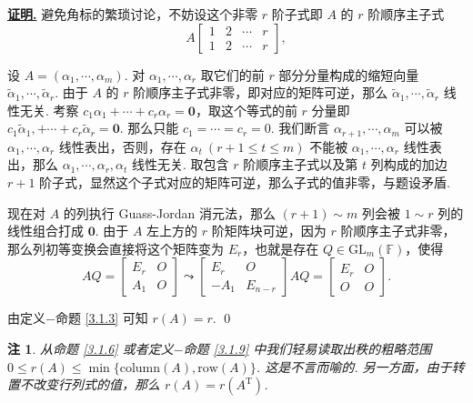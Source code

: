 \documentclass[10pt,openany]{article}
\theoremstyle{thmstyle} %
\theoremstyle{defstyle} %
\theoremstyle{prostyle} %
\theoremstyle{exastyle}
\theoremstyle{remstyle}
\newtheorem{remark}[theorem]{注}
\renewenvironment{proof}[1][证明]{\par\underline{\textbf{#1.}} \;\fangsong}{\qed\par}
\newcommand{\T}{^{\text{T}}}
\newcommand{\gfm}{\text{GL}_m(\mathbb{F})}
\begin{document}
\begin{proof}
	避免角标的繁琐讨论，不妨设这个非零 \( r \) 阶子式即 \( A \) 的 \( r \) 阶顺序主子式
	\[ A\begin{bmatrix}
		1 & 2 & \cdots & r \\
		1 & 2 & \cdots & r
	\end{bmatrix}, \]
	
	设 \( A=(\alpha_1,\cdots,\alpha_m) \). 对 \( \alpha_1,\cdots,\alpha_r \) 取它们的前 \( r \) 部分分量构成的缩短向量 \( \widetilde{\alpha}_1, \cdots, \widetilde{\alpha}_r \). 由于 \( A \) 的 \( r \) 阶顺序主子式非零，即对应的矩阵可逆，那么 \( \widetilde{\alpha}_1, \cdots, \widetilde{\alpha}_r  \) 线性无关. 考察 \( c_1\alpha_1+\cdots+c_r\alpha_r=\bm{0} \)，取这个等式的前 \( r \) 分量即 \( c_1\widetilde{\alpha}_1,+\cdots+c_r\widetilde{\alpha}_r=\bm{0} \). 那么只能 \( c_1=\cdots=c_r=0 \). 我们断言 \( \alpha_{r+1},\cdots,\alpha_m \) 可以被 \( \alpha_1,\cdots,\alpha_r \) 线性表出，否则，存在 \( \alpha_t \ (r+1 \leq t \leq m) \) 不能被  \( \alpha_1,\cdots,\alpha_r \) 线性表出，那么 \( \alpha_1,\cdots,\alpha_r,\alpha_t \) 线性无关. 取包含 \( r \) 阶顺序主子式以及第 \( t \) 列构成的加边 \( r+1 \) 阶子式，显然这个子式对应的矩阵可逆，那么子式的值非零，与题设矛盾.
	
	现在对 \( A \) 的列执行 Guass-Jordan 消元法，那么 \( (r+1) \sim m \) 列会被 \( 1 \sim r \) 列的线性组合打成 \( \bm{0} \). 由于 \( A \) 左上方的 \( r \) 阶矩阵块可逆，因为 \( r \) 阶顺序主子式非零，那么列初等变换会直接将这个矩阵变为 \( E_r \)，也就是存在 \( Q \in \gfm \)，使得
	\[ AQ=\begin{bmatrix}
		E_r & O \\
		A_1 & O
	\end{bmatrix} \leadsto \begin{bmatrix}
	E_r & O \\
	-A_1 & E_{n-r}
	\end{bmatrix}AQ=\begin{bmatrix}
	E_r & O \\
	O & O
	\end{bmatrix}. \]
	
	由定义\(-\)命题 \ref{3.1.3} 可知 \( r(A)=r \).
\end{proof}

\begin{remark} \label{3.1.12}
	从命题 \ref{3.1.6} 或者定义\(-\)命题 \ref{3.1.9} 中我们轻易读取出秩的粗略范围 \( 0 \leq r(A) \leq \min\{\text{column}(A), \text{row}(A) \} \). 这是不言而喻的. 另一方面，由于转置不改变行列式的值，那么 \( r(A)=r(A\T) \).
\end{remark}
\end{document}
